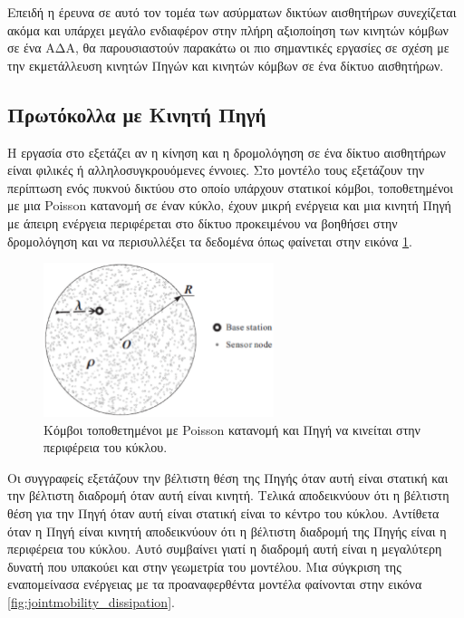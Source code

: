 Επειδή η έρευνα σε αυτό τον τομέα των ασύρματων δικτύων αισθητήρων συνεχίζεται ακόμα και υπάρχει μεγάλο ενδιαφέρον στην πλήρη αξιοποίηση των κινητών κόμβων σε ένα
ΑΔΑ, θα παρουσιαστούν παρακάτω οι πιο σημαντικές εργασίες σε σχέση με την εκμετάλλευση κινητών Πηγών και κινητών κόμβων σε ένα δίκτυο αισθητήρων.

\subsection{Πρωτόκολλα με Κινητή Πηγή}
Η εργασία στο \cite{jointmobility} εξετάζει αν η κίνηση και η δρομολόγηση σε ένα δίκτυο αισθητήρων είναι φιλικές ή αλληλοσυγκρουόμενες έννοιες. Στο μοντέλο τους
εξετάζουν την περίπτωση ενός πυκνού δικτύου στο οποίο υπάρχουν στατικοί κόμβοι, τοποθετημένοι με μια Poisson κατανομή σε έναν κύκλο, έχουν μικρή ενέργεια και μια
κινητή Πηγή με άπειρη ενέργεια περιφέρεται στο δίκτυο προκειμένου να βοηθήσει στην δρομολόγηση και να περισυλλέξει τα δεδομένα όπως φαίνεται στην εικόνα
\ref{fig:jointmobility_model}.
\begin{figure}[h]
	\centering
	\includegraphics[width=0.6\textwidth]{images/jointmobility_model.eps}
	\caption{Κόμβοι τοποθετημένοι με Poisson κατανομή και Πηγή να κινείται στην περιφέρεια του κύκλου.}
	\label{fig:jointmobility_model}
\end{figure}
Οι συγγραφείς εξετάζουν την βέλτιστη θέση της Πηγής όταν αυτή είναι στατική και την βέλτιστη διαδρομή όταν αυτή είναι κινητή. Τελικά αποδεικνύουν ότι η βέλτιστη θέση
για την Πηγή όταν αυτή είναι στατική είναι το κέντρο του κύκλου. Αντίθετα όταν η Πηγή είναι κινητή αποδεικνύουν ότι η βέλτιστη διαδρομή της Πηγής είναι η περιφέρεια
του κύκλου. Αυτό συμβαίνει γιατί η διαδρομή αυτή είναι η μεγαλύτερη δυνατή που υπακούει και στην γεωμετρία του μοντέλου. Μια σύγκριση της εναπομείνασα ενέργειας με
τα προαναφερθέντα μοντέλα φαίνονται στην εικόνα \ref{fig:jointmobility_dissipation}.
